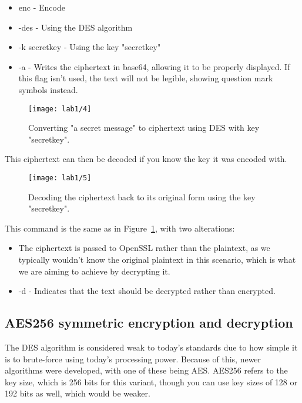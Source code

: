 \begin{itemize}
    \item enc - Encode
    \item -des - Using the DES algorithm
    \item -k secretkey - Using the key "secretkey"
    \item -a - Writes the ciphertext in base64, allowing it to be properly displayed.
               If this flag isn't used, the text will not be legible, showing question mark symbols instead.
\end{itemize}

\begin{figure}[H]
    \centering
    \texttt{[image: lab1/4]}
    \caption{Converting "a secret message" to ciphertext using DES with key "secretkey".}
    \label{fig:DESEncrypt}
\end{figure}

This ciphertext can then be decoded if you know the key it was encoded with.

\begin{figure}[H]
    \centering
    \texttt{[image: lab1/5]}
    \caption{Decoding the ciphertext back to its original form using the key "secretkey".}
    \label{fig:DESDecrypt}
\end{figure}

This command is the same as in Figure~\ref{fig:DESEncrypt}, with two alterations:
\begin{itemize}
    \item The ciphertext is passed to OpenSSL rather than the plaintext, as we typically wouldn't know
          the original plaintext in this scenario, which is what we are aiming to achieve by decrypting it.
    \item -d - Indicates that the text should be decrypted rather than encrypted.
\end{itemize}\newline

\pagebreak

\subsection{AES256 symmetric encryption and decryption}\label{subsec:aes256}
The DES algorithm is considered weak to today's standards due to how simple it is to
brute-force using today's processing power.
Because of this, newer algorithms were developed, with one of these being AES\@.
AES256 refers to the key size, which is 256 bits for this variant, though you can use key sizes of
128 or 192 bits as well, which would be weaker.

